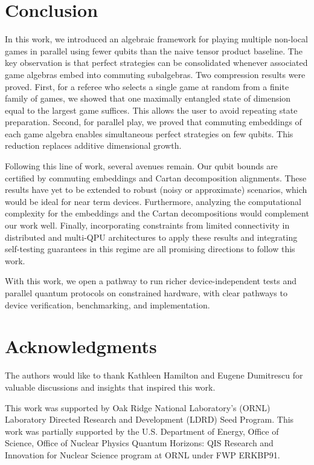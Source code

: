 \documentclass{article}
\begin{document}
    \section{Conclusion}\label{sec: conclusion}
In this work, we introduced an algebraic framework for playing multiple non-local games in parallel using fewer qubits than the naive tensor product baseline. The key observation is that perfect strategies can be consolidated whenever associated game algebras embed into commuting subalgebras. Two compression results were proved. First, for a referee who selects a single game at random from a finite family of games, we showed that one maximally entangled state of dimension equal to the largest game suffices. This allows the user to avoid repeating state preparation. Second, for parallel play, we proved that commuting embeddings of each game algebra enables simultaneous perfect strategies on few qubits. This reduction replaces additive dimensional growth. 

Following this line of work, several avenues remain. Our qubit bounds are certified by commuting embeddings and Cartan decomposition alignments. These results have yet to be extended to robust (noisy or approximate) scenarios, which would be ideal for near term devices. Furthermore, analyzing the computational complexity for the embeddings and the Cartan decompositions would complement our work well. Finally, incorporating constraints from limited connectivity in distributed and multi-QPU architectures to apply these results and integrating self-testing guarantees in this regime are all promising directions to follow this work.

With this work, we open a pathway to run richer device-independent tests and parallel quantum protocols on constrained hardware, with clear pathways to device verification, benchmarking, and implementation.

\section{Acknowledgments}\label{sec: acknowledgments}
The authors would like to thank Kathleen Hamilton and Eugene Dumitrescu for valuable discussions and insights that inspired this work.

This work was supported by Oak Ridge National Laboratory's (ORNL) Laboratory Directed Research and Development (LDRD) Seed Program. This work was partially supported by the U.S. Department of Energy, Office of Science, Office of Nuclear Physics Quantum Horizons: QIS Research and Innovation for Nuclear Science program at ORNL under FWP ERKBP91.


%
\end{document}
